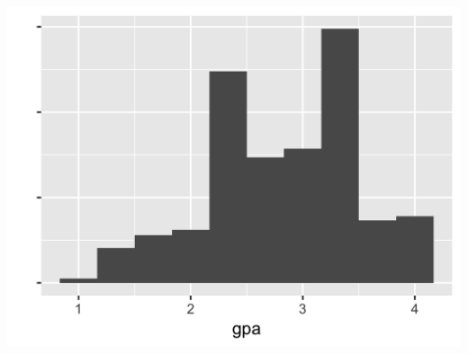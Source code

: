 \documentclass[aspectratio=169]{beamer}
\begin{document}
\begin{frame}

\centering
\includegraphics[width = .8\textwidth]{figures/gpaDist}

\end{frame}
\end{document}
